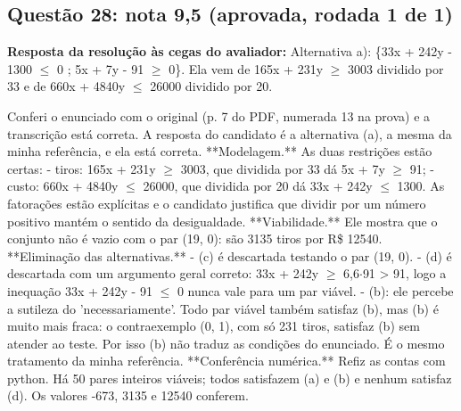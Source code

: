\documentclass{article}%
\begin{document}
\subsection*{Questão 28: nota 9,5 (aprovada, rodada 1 de 1)}%
\textbf{Resposta da resolução às cegas do avaliador:} Alternativa a): \{33x + 242y - 1300 $\leq$ 0 ; 5x + 7y - 91 $\geq$ 0\}. Ela vem de 165x + 231y $\geq$ 3003 dividido por 33 e de 660x + 4840y $\leq$ 26000 dividido por 20.\par %
Conferi o enunciado com o original (p. 7 do PDF, numerada 13 na prova) e a transcrição está correta. A resposta do candidato é a alternativa (a), a mesma da minha referência, e ela está correta.\newline%
\newline%
**Modelagem.** As duas restrições estão certas:\newline%
{-} tiros: 165x + 231y $\geq$ 3003, que dividida por 33 dá 5x + 7y $\geq$ 91;\newline%
{-} custo: 660x + 4840y $\leq$ 26000, que dividida por 20 dá 33x + 242y $\leq$ 1300.\newline%
\newline%
As fatorações estão explícitas e o candidato justifica que dividir por um número positivo mantém o sentido da desigualdade.\newline%
\newline%
**Viabilidade.** Ele mostra que o conjunto não é vazio com o par (19, 0): são 3135 tiros por R\$ 12540.\newline%
\newline%
**Eliminação das alternativas.**\newline%
{-} (c) é descartada testando o par (19, 0).\newline%
{-} (d) é descartada com um argumento geral correto: 33x + 242y $\geq$ 6,6$\cdot$91 > 91, logo a inequação 33x + 242y - 91 $\leq$ 0 nunca vale para um par viável.\newline%
{-} (b): ele percebe a sutileza do 'necessariamente'. Todo par viável também satisfaz (b), mas (b) é muito mais fraca: o contraexemplo (0, 1), com só 231 tiros, satisfaz (b) sem atender ao teste. Por isso (b) não traduz as condições do enunciado. É o mesmo tratamento da minha referência.\newline%
\newline%
**Conferência numérica.** Refiz as contas com python. Há 50 pares inteiros viáveis; todos satisfazem (a) e (b) e nenhum satisfaz (d). Os valores -673, 3135 e 12540 conferem.\newline%
\end{document}
